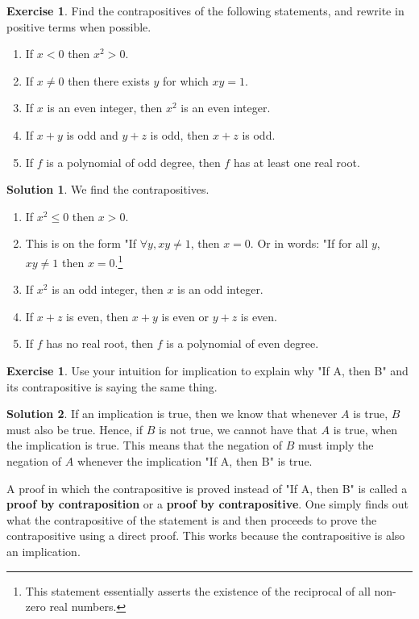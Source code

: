 \documentclass[a4paper, 11pt]{report}
\theoremstyle{plain}
\theoremstyle{definition}
\newtheorem{exrc}[thm]{Exercise}
\newtheorem*{sltn}{Solution}
\begin{document}
\begin{exrc}
  Find the contrapositives of the following statements, and rewrite in positive terms when possible.
  \begin{enumerate}
    \item If $x < 0$ then $x^2 > 0$.
    \item If $x \neq 0$ then there exists $y$ for which $xy = 1$.
    \item If $x$ is an even integer, then $x^2$ is an even integer.
    \item If $x + y$ is odd and $y + z$ is odd, then $x + z$ is odd.
    \item If $f$ is a polynomial of odd degree, then $f$ has at least one real root.
  \end{enumerate}
\end{exrc}
\begin{sltn}
    We find the contrapositives.
   \begin{enumerate}
    \item If $x^2 \leq 0$ then $x > 0$.
    \item This is on the form "If $\forall y, xy \neq 1$, then $x = 0$. Or in
      words: "If for all $y$, $xy \neq 1$ then $x = 0$.\footnote{This statement
      essentially asserts the existence of the reciprocal of all non-zero real
    numbers.}
   \item If $x^2$ is an odd integer, then $x$ is an odd integer.
   \item If $x + z$ is even, then $x + y$ is even or $y + z$ is even.
   \item If $f$ has no real root, then $f$ is a polynomial of even degree.
   \end{enumerate} 
\end{sltn}

\begin{exrc}
  Use your intuition for implication to explain why "If A, then B" and its
  contrapositive is saying the same thing.
\end{exrc}
\begin{sltn}
  If an implication is true, then we know that whenever $A$ is true, $B$ must
  also be true.  Hence, if $B$ is not true, we cannot have that $A$ is true, when
  the implication is true. This means that the negation of $B$ must imply the
  negation of $A$ whenever the implication "If A, then B" is true.
\end{sltn}

A proof in which the contrapositive is proved instead of "If A, then B" is
called a \textbf{proof by contraposition} or a
\textbf{proof by contrapositive}. One simply finds out what the contrapositive
of the statement is and then proceeds to prove the contrapositive using a
direct proof. This works because the contrapositive is also an implication.
\end{document}
